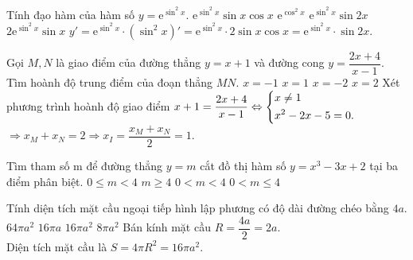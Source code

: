 \begin{ex}%
Tính đạo hàm của hàm số $ y = \mathrm{e}^{\sin^2 x}. $
\choice
	{$ \mathrm{e}^{\sin^2 x} \sin x \cos x $}
	{$ \mathrm{e}^{\cos^2 x} $}
	{\True $ \mathrm{e}^{\sin^2 x} \sin 2x $}
	{$ 2\mathrm{e}^{\sin^2 x} \sin x$}
	\loigiai
	{
$ y' = \mathrm{e}^{\sin^2 x} \cdot \left(\sin^2 x\right)' =\mathrm{e}^{\sin^2 x} \cdot 2 \sin x \cos x = \mathrm{e}^{\sin^2 x} \cdot \sin 2x.  $
	}
\end{ex}
\begin{ex}%
Gọi $ M, N $ là giao điểm của đường thẳng $ y = x + 1 $ và đường cong $ y = \dfrac{2x+4}{x-1} $. Tìm hoành độ trung điểm của đoạn thẳng $ MN. $
\choice
{$ x = -1 $}
{\True $ x = 1 $}
{$ x = -2 $}
{ $ x = 2$}
	\loigiai
{Xét phương trình hoành độ giao điểm $ x+ 1 = \dfrac{2x +4}{x-1} \Leftrightarrow \left\{\begin{aligned}&x \ne 1\\ &x^2 - 2x- 5 = 0.\end{aligned}\right.$\\
	$ \Rightarrow x_M + x_N = 2 \Rightarrow x_I = \dfrac{x_M+x_N}{2} = 1.$}
\end{ex}
\begin{ex}%
Tìm tham số m để đường thẳng $ y = m $ cắt đồ thị hàm số $ y = x^3 - 3x + 2 $ tại ba điểm phân biệt.
 \choice
{$ 0 \le m < 4 $}
{ $ m \ge 4 $}
{\True $0 < m < 4$}
{$0 < m \le 4$}
\end{ex}
\begin{ex}%
Tính diện tích mặt cầu ngoại tiếp hình lập phương có độ dài đường chéo bằng $ 4a. $
\choice
{$ 64\pi a^2 $}
{$ 16\pi a $}
{\True $ 16 \pi a^2 $}
{$ 8 \pi a^2 $}
	\loigiai
	{
Bán kính mặt cầu $ R = \dfrac{4a}{2} = 2a. $		\\
Diện tích mặt cầu là $ S = 4 \pi R^2 = 16 \pi a^2. $
	}
\end{ex}
